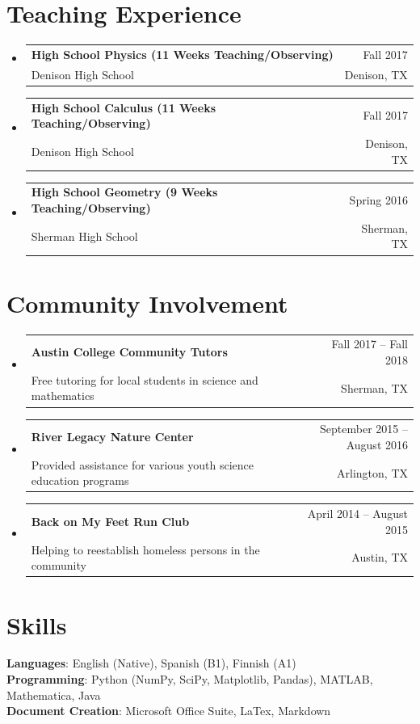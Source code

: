 \documentclass[A4,11pt]{article}
\makeatletter
\newcommand{\CVSubheading}[4]{
  \vspace{-2pt}\item
    \begin{tabular*}{0.97\textwidth}[t]{l@{\extracolsep{\fill}}r}
      \textbf{#1} & #2 \\
      \small#3 & \small #4 \\
    \end{tabular*}\vspace{-7pt}
}
\newcommand{\CVSubHeadingListStart}{\begin{itemize}[leftmargin=0.5cm, label={}]}
\newcommand{\CVSubHeadingListEnd}{\end{itemize}}
\makeatother
\begin{document}
\section{Teaching Experience}
  \CVSubHeadingListStart
    \CVSubheading
      {High School Physics (11 Weeks Teaching/Observing)}{Fall 2017}
      {Denison High School}{Denison, TX}
    \CVSubheading
      {High School Calculus (11 Weeks Teaching/Observing)}{Fall 2017}
      {Denison High School}{Denison, TX}
    \CVSubheading
      {High School Geometry (9 Weeks Teaching/Observing)}{Spring 2016}
      {Sherman High School}{Sherman, TX}
  \CVSubHeadingListEnd

\section{Community Involvement}
  \CVSubHeadingListStart
    \CVSubheading
      {Austin College Community Tutors}{Fall 2017 -- Fall 2018}
      {Free tutoring for local students in science and mathematics}{Sherman, TX}
    \CVSubheading
      {River Legacy Nature Center}{September 2015 -- August 2016}
      {Provided assistance for various youth science education programs}{Arlington, TX}
    \CVSubheading
      {Back on My Feet Run Club}{April 2014 -- August 2015}
      {Helping to reestablish homeless persons in the community}{Austin, TX}
  \CVSubHeadingListEnd

\section{Skills}
 \begin{itemize}[leftmargin=0.5cm, label={}]
    \small{\item{
     \textbf{Languages}{: English (Native), Spanish (B1), Finnish (A1)} \\
     \textbf{Programming}{: Python (NumPy, SciPy, Matplotlib, Pandas), MATLAB, Mathematica, Java} \\
     \textbf{Document Creation}{: Microsoft Office Suite, LaTex, Markdown} \\
    }}
 \end{itemize}
    
\end{document}
